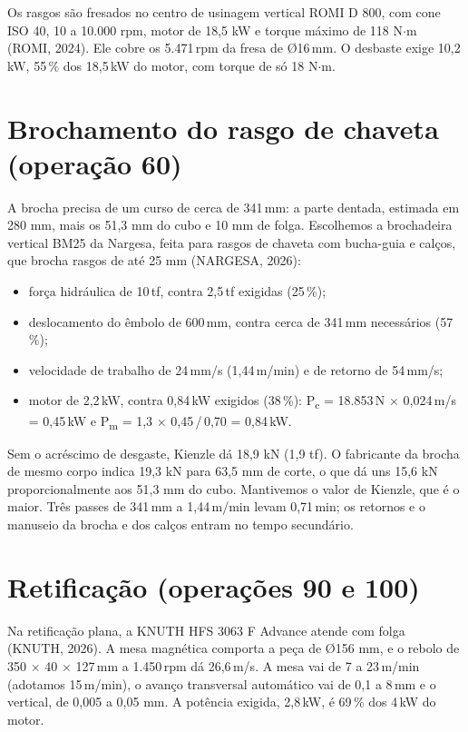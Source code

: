 Os rasgos são fresados no centro de usinagem vertical ROMI D 800, com cone ISO 40, 10 a 10.000 rpm, motor de 18,5 kW e torque máximo de 118 N$\cdot$m (ROMI, 2024). Ele cobre os 5.471\,rpm da fresa de Ø16\,mm. O desbaste exige 10,2\,kW, 55\,\% dos 18,5\,kW do motor, com torque de só 18 N$\cdot$m.

\section{Brochamento do rasgo de chaveta (operação 60)}

A brocha precisa de um curso de cerca de 341\,mm: a parte dentada, estimada em 280 mm, mais os 51,3 mm do cubo e 10 mm de folga. Escolhemos a brochadeira vertical BM25 da Nargesa, feita para rasgos de chaveta com bucha-guia e calços, que brocha rasgos de até 25 mm (NARGESA, 2026):

\begin{itemize}
\item força hidráulica de 10\,tf, contra 2,5\,tf exigidas (25\,\%);
\item deslocamento do êmbolo de 600\,mm, contra cerca de 341\,mm necessários (57\,\%);
\item velocidade de trabalho de 24\,mm/s (1,44\,m/min) e de retorno de 54\,mm/s;
\item motor de 2,2\,kW, contra 0,84\,kW exigidos (38\,\%): P\textsubscript{c} = 18.853\,N $\times$ 0,024\,m/s = 0,45\,kW e P\textsubscript{m} = 1,3 $\times$ 0,45\,/\,0,70 = 0,84\,kW.
\end{itemize}

Sem o acréscimo de desgaste, Kienzle dá 18,9 kN (1,9 tf). O fabricante da brocha de mesmo corpo indica 19,3 kN para 63,5 mm de corte, o que dá uns 15,6 kN proporcionalmente aos 51,3 mm do cubo. Mantivemos o valor de Kienzle, que é o maior. Três passes de 341\,mm a 1,44\,m/min levam 0,71\,min; os retornos e o manuseio da brocha e dos calços entram no tempo secundário.

\section{Retificação (operações 90 e 100)}\label{sec:ret}

Na retificação plana, a KNUTH HFS 3063 F Advance atende com folga (KNUTH, 2026). A mesa magnética comporta a peça de Ø156 mm, e o rebolo de 350 $\times$ 40 $\times$ 127\,mm a 1.450\,rpm dá 26,6\,m/s. A mesa vai de 7 a 23\,m/min (adotamos 15\,m/min), o avanço transversal automático vai de 0,1 a 8\,mm e o vertical, de 0,005 a 0,05 mm. A potência exigida, 2,8\,kW, é 69\,\% dos 4\,kW do motor.

